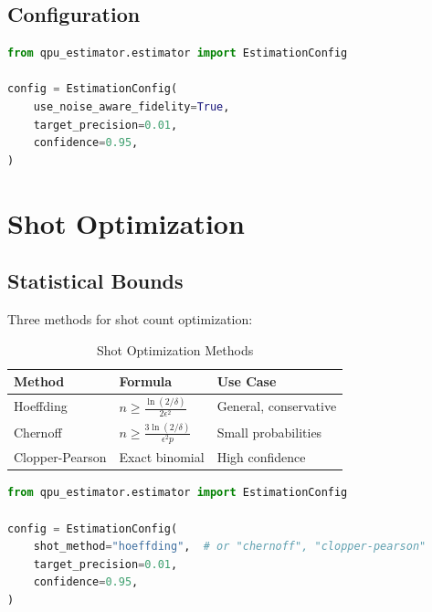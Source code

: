 \documentclass[11pt,a4paper]{article}
\begin{document}
\subsection{Configuration}

\begin{lstlisting}[language=Python,caption=Noise Model Configuration]
from qpu_estimator.estimator import EstimationConfig

config = EstimationConfig(
    use_noise_aware_fidelity=True,
    target_precision=0.01,
    confidence=0.95,
)
\end{lstlisting}

\section{Shot Optimization}

\subsection{Statistical Bounds}

Three methods for shot count optimization:

\begin{table}[htbp]
\centering
\caption{Shot Optimization Methods}
\begin{tabular}{@{}llp{6cm}@{}}
\toprule
\textbf{Method} & \textbf{Formula} & \textbf{Use Case} \\
\midrule
Hoeffding & $n \geq \frac{\ln(2/\delta)}{2\epsilon^2}$ & General, conservative \\
Chernoff & $n \geq \frac{3\ln(2/\delta)}{\epsilon^2 p}$ & Small probabilities \\
Clopper-Pearson & Exact binomial & High confidence \\
\bottomrule
\end{tabular}
\end{table}

\begin{lstlisting}[language=Python,caption=Shot Optimization]
from qpu_estimator.estimator import EstimationConfig

config = EstimationConfig(
    shot_method="hoeffding",  # or "chernoff", "clopper-pearson"
    target_precision=0.01,
    confidence=0.95,
)
\end{lstlisting}

\end{document}
